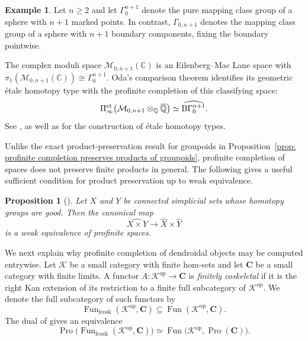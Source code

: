 \documentclass{amsart}
\newcommand{\bC}{\mathbf{C}}
\newcommand{\Pro}{\operatorname{Pro}}
\newcommand{\Fun}{\operatorname{Fun}}
\newcommand{\cs}{\textnormal{B}}
\newtheorem{prop}[theorem]{Proposition}%
\theoremstyle{definition}
\newtheorem{example}[theorem]{Example}%
\numberwithin{equation}{section}
\begin{document}
\begin{example}
\label{example: Oda's theorem}
Let $n\geq2$ and let $\Gamma_0^{n+1}$ denote the pure mapping class
group of a sphere with $n+1$ marked points. In contrast,
$\Gamma_{0,n+1}$ denotes the mapping class group of a sphere with
$n+1$ boundary components, fixing the boundary pointwise.

The complex moduli space $\mathcal M_{0,n+1}(\mathbb C)$ is an
Eilenberg--Mac Lane space with
$\pi_1(\mathcal M_{0,n+1}(\mathbb C))\cong\Gamma_0^{n+1}$.
Oda's comparison theorem identifies its geometric étale homotopy type
with the profinite completion of this classifying space:
\[
\Pi_\infty^{\mathrm{et}}
\bigl(
\mathcal M_{0,n+1}
\otimes_{\mathbb Q}\overline{\mathbb Q}
\bigr)
\simeq
\widehat{\cs\Gamma_0^{n+1}}.
\]
See \cite[Theorem~1]{Oda}, as well as
\cite{Artin_Mazur,Friedlander} for the construction of étale homotopy
types.
\end{example}

Unlike the exact product-preservation result for groupoids in
Proposition~\ref{prop: profinite completion preserves products of groupoids},
profinite completion of spaces does not preserve finite products in
general. The following gives a useful sufficient condition for
product preservation up to weak equivalence.

\begin{prop}[{\cite[Proposition~3.9]{Boavida-Horel-Robertson}}]
\label{prop: profinite spaces products}
Let $X$ and $Y$ be connected simplicial sets whose homotopy groups are
good. Then the canonical map
\[
\widehat{X\times Y}
\longrightarrow
\widehat X\times\widehat Y
\]
is a weak equivalence of profinite spaces.
\end{prop}


We next explain why profinite completion of dendroidal objects may be
computed entrywise. Let $\mathscr K$ be a small category with finite
hom-sets and let $\bC$ be a small category with finite limits. A
functor $A\colon\mathscr K^{\mathrm{op}}\to\bC$ is
\emph{finitely coskeletal} if it is the right Kan extension of its
restriction to a finite full subcategory of
$\mathscr K^{\mathrm{op}}$. We denote the full subcategory of such
functors by
\[
\Fun_{\mathrm{fcosk}}(\mathscr K^{\mathrm{op}},\bC)
\subseteq
\Fun(\mathscr K^{\mathrm{op}},\bC).
\]
The dual of \cite[Theorem~2.3]{BM20} gives an equivalence
\[
\Pro\bigl(
\Fun_{\mathrm{fcosk}}(\mathscr K^{\mathrm{op}},\bC)
\bigr)
\simeq
\Fun\bigl(\mathscr K^{\mathrm{op}},\Pro(\bC)\bigr).
\]
\end{document}
